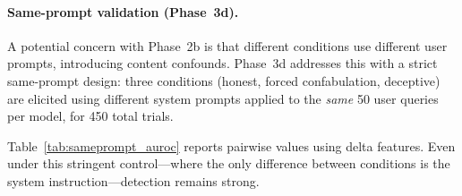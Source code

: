 \paragraph{Same-prompt validation (Phase~3d).}
A potential concern with Phase~2b is that different conditions use different user prompts, introducing content confounds.
Phase~3d addresses this with a strict same-prompt design: three conditions (honest, forced confabulation, deceptive) are elicited using different system prompts applied to the \emph{same} 50 user queries per model, for 450 total trials.

Table~\ref{tab:sameprompt_auroc} reports pairwise \fwl \auroc values using delta features.
Even under this stringent control---where the only difference between conditions is the system instruction---detection remains strong.

